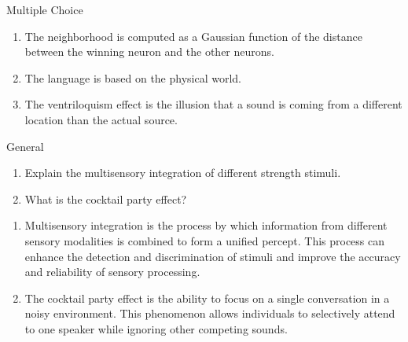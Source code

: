 \documentclass{article}
\begin{document}
\begin{exercise}{Multiple Choice}
  \begin{solution}
    \begin{enumerate}
      \item The neighborhood is computed as a Gaussian function of the distance between the winning neuron and the other neurons.
      \item The language is based on the physical world.
      \item The ventriloquism effect is the illusion that a sound is coming from a different location than the actual source.
    \end{enumerate}
  \end{solution}
\end{exercise}

\begin{exercise}{General}
  \begin{enumerate}
    \item Explain the multisensory integration of different strength stimuli.
    \item What is the cocktail party effect?
  \end{enumerate}

  \begin{solution}
    \begin{enumerate}
      \item Multisensory integration is the process by which information from different sensory modalities is combined to form a unified percept. This process can enhance the detection and discrimination of stimuli and improve the accuracy and reliability of sensory processing.
      \item The cocktail party effect is the ability to focus on a single conversation in a noisy environment. This phenomenon allows individuals to selectively attend to one speaker while ignoring other competing sounds.
    \end{enumerate}
  \end{solution}
\end{exercise}
\end{document}
